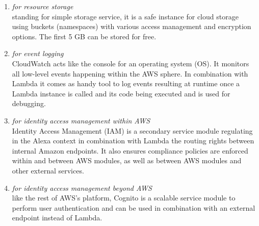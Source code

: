 \begin{enumerate}
\item[\href{https://aws.amazon.com/s3/}{\textbf{S3}} \footnote{\url{https://aws.amazon.com/s3}}] \textit{for resource storage}\\
standing for simple storage service, it is a safe instance for cloud storage using buckets (namespaces) with various access management and encryption options. The first 5 GB can be stored for free.


	\item[\href{https://aws.amazon.com/iam/}{\textbf{CloudWatch}} \footnote{\url{https://aws.amazon.com/cloudwatch}}]
	\textit{for event logging}\\
	CloudWatch acts like the console for an operating system (OS). It monitors all low-level events happening within the AWS sphere. In combination with Lambda it comes as handy tool to log events resulting at runtime once a Lambda instance is called and its code being executed and is used for debugging.
	
	


	\item[\href{https://aws.amazon.com/iam/}{\textbf{IAM}} \footnote{\url{https://aws.amazon.com/iam}}]
	\textit{for identity access management within AWS}\\
	Identity Access Management (IAM) is a secondary service module regulating in the Alexa context in combination with Lambda the routing rights between internal Amazon endpoints. It also ensures compliance policies are enforced within and between AWS modules, as well as between AWS modules and other external services.
%	
%	


	\item[\href{https://aws.amazon.com/cognito/}{\textbf{Cognito}} \footnote{\url{https://aws.amazon.com/cognito}}]
	\textit{for identity access management beyond AWS}\\
	like the rest of AWS's platform, Cognito is a scalable service module to perform user authentication and can be used in combination with an external endpoint instead of Lambda.
	
	
\end{enumerate}


